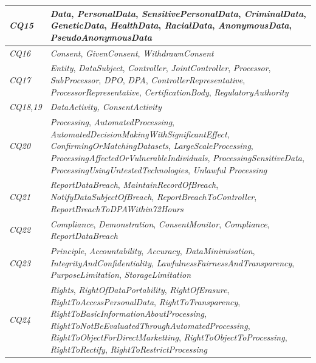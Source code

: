 \begin{table}[htbp]
\begin{tabularx}{\textwidth}{|l|X|}
\textit{CQ15} & \textit{Data}, \textit{PersonalData}, \textit{SensitivePersonalData}, \textit{CriminalData}, \textit{GeneticData}, \textit{HealthData}, \textit{RacialData}, \textit{AnonymousData}, \textit{PseudoAnonymousData} \\ \hline
\textit{CQ16} & \textit{Consent}, \textit{GivenConsent}, \textit{WithdrawnConsent} \\ \hline
\textit{CQ17} & \textit{Entity}, \textit{DataSubject}, \textit{Controller}, \textit{JointController}, \textit{Processor}, \textit{SubProcessor}, \textit{DPO}, \textit{DPA}, \textit{ControllerRepresentative}, \textit{ProcessorRepresentative}, \textit{CertificationBody}, \textit{RegulatoryAuthority} \\ \hline
\textit{CQ18,19} & \textit{DataActivity, ConsentActivity} \\ \hline
\textit{CQ20} & \textit{Processing}, \textit{AutomatedProcessing}, \textit{AutomatedDecisionMakingWithSignificantEffect}, \textit{ConfirmingOrMatchingDatasets}, \textit{LargeScaleProcessing}, \textit{ProcessingAffectedOrVulnerableIndividuals}, \textit{ProcessingSensitiveData}, \textit{ProcessingUsingUntestedTechnologies}, \textit{Unlawful} \textit{Processing} \\ \hline
\textit{CQ21} & \textit{ReportDataBreach}, \textit{MaintainRecordOfBreach},  \textit{NotifyDataSubjectOfBreach}, \textit{ReportBreachToController}, \textit{ReportBreachToDPAWithin72Hours} \\ \hline
\textit{CQ22} & \textit{Compliance}, \textit{Demonstration}, \textit{ConsentMonitor}, \textit{Compliance}, \textit{ReportDataBreach}  \\ \hline
\textit{CQ23} & \textit{Principle}, \textit{Accountability}, \textit{Accuracy}, \textit{DataMinimisation}, \textit{IntegrityAndConfidentiality}, \textit{LawfulnessFairnessAndTransparency}, \textit{PurposeLimitation}, \textit{StorageLimitation}  \\ \hline
\textit{CQ24} & \textit{Rights}, \textit{RightOfDataPortability}, \textit{RightOfErasure}, \textit{RightToAccessPersonalData}, \textit{RightToTransparency}, \textit{RightToBasicInformationAboutProcessing}, \textit{RightToNotBeEvaluatedThroughAutomatedProcessing}, \textit{RightToObjectForDirectMarketting}, \textit{RightToObjectToProcessing}, \textit{RightToRectify}, \textit{RightToRestrictProcessing} \\ \hline

\end{tabularx}
\end{table}
